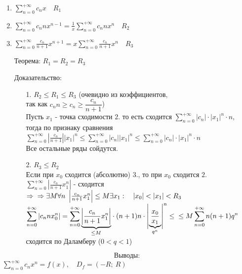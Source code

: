 \documentclass[12pt, letterpaper, twoside]{article}
\newcommand{\DS}{\displaystyle}
\newcommand{\oo}{\infty}
\newcommand{\Abs}[1]{\left| #1 \right|}
\begin{document}
    \begin{enumerate}
        \item $\DS \sum_{n = 0}^{+\oo} c_n x\quad R_1$
        \item $\DS \sum_{n = 0}^{+\oo} c_n n x^{n - 1} = \frac{1}{x} \sum_{n = 0}^{+\oo} c_n n x^n\quad R_2$
        \item $\DS \sum_{n = 0}^{+\oo} \frac{c_n}{n + 1} x^{n + 1} = x\sum_{n = 0}^{+\oo}\frac{c_n}{n + 1} x^n\quad R_3$
        \item[Теорема:] $R_1 = R_2 = R_3$
        \item[Доказательство:]
        \begin{enumerate}
            \item[1.] $R_2 \leq R_1 \leq R_3$ (очевидно из коэффициентов,\\
            так как $c_n n \geq c_n \geq \dfrac{c_n}{n + 1}$)\\
            Пусть $x_1$ - точка сходимости $2.$ то есть сходится $\DS \sum_{n = 0}^{+\oo}\Abs{c_n}\cdot \Abs{x_1}^n \cdot n$, тогда по признаку сравнения\\
            $\DS \sum_{n = 0}^{+\oo} \Abs{\frac{c_n}{n + 1}}\Abs{x_1}^n \leq \sum_{n = 0}^{+\oo} \Abs{c_n}\Abs{x_1}^n\leq \sum_{n = 0}^{+\oo}\Abs{c_n}\cdot \Abs{x_1}^n \cdot n$\\
            Все остальные ряды сойдутся.
            \item[2.] $R_3 \leq R_2$\\
            Если при $x_0$ сходится (абсолютно) $3.$, то при $x_0$ сходится $2.$\\
            $\DS \sum_{n = 0}^{+\oo} \Abs{\frac{c_n}{n + 1} x_1^n}$ - сходится $\Rightarrow\\
            \Rightarrow \exists M \forall n\ \Abs{\frac{c_n}{n + 1} x_1^n}\leq M\\
            \exists x_1:\quad \Abs{x_0} < \Abs{x_1} < R_3$\\
            $\DS\sum_{n = 0}^{+\oo} \Abs{c_n n x_0^n} = \sum_{n = 0}^{+\oo} \underset{\leq M}{\underbrace{\Abs{\frac{c_n}{n + 1}x_1^n}}}\cdot(n + 1)n\cdot \underset{q^n}{\Abs{\underbrace{\frac{x_0}{x_1}}}}^n \leq \\
            \leq M \sum_{n = 0}^{+\oo} n(n  + 1)q^n$ сходится по Даламберу ($0 < q < 1$)
        \end{enumerate} 
    \end{enumerate}
    \[\text{Выводы:}\]
    $\DS \sum_{n = 0}^{+\oo} c_n x^n = f(x),\quad D_f = (-R;\ R)$\\
\end{document}
